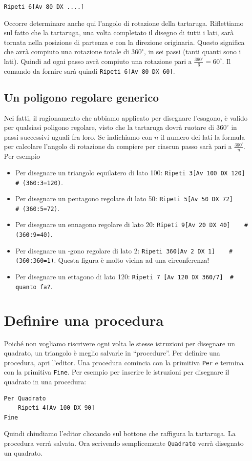 \begin{lstlisting}
Ripeti 6[Av 80 DX ....]
\end{lstlisting}
Occorre determinare anche qui l'angolo di rotazione della tartaruga. Riflettiamo sul fatto che la tartaruga, una volta completato il disegno di tutti i lati, sarà tornata nella posizione di partenza e con la direzione originaria. Questo significa che avrà compiuto una rotazione totale di $360^{\circ}$, in sei passi (tanti quanti sono i lati). Quindi ad ogni passo avrà compiuto una rotazione pari a $\frac{360^{\circ}}{6}=60^{\circ}$. Il comando da fornire sarà quindi \lstinline!Ripeti 6[Av 80 DX 60]!.



\subsection{Un poligono regolare generico}
Nei fatti, il ragionamento che abbiamo applicato per disegnare l'esagono, è valido per qualsiasi poligono regolare, visto che la tartaruga dovrà ruotare di $360^{\circ}$ in passi successivi uguali fra loro. Se indichiamo con $n$ il numero dei lati la formula per calcolare l'angolo di rotazione da compiere per ciascun passo sarà pari a $\frac{360^{\circ}}{n}$. Per esempio
\begin{itemize}
	\item Per disegnare un triangolo equilatero di lato 100: \lstinline!Ripeti 3[Av 100 DX 120]    # (360:3=120)!.
	\item Per disegnare un pentagono regolare di lato 50: \lstinline!Ripeti 5[Av 50 DX 72]    # (360:5=72)!.
	\item Per disegnare un ennagono regolare di lato 20: \lstinline!Ripeti 9[Av 20 DX 40]    # (360:9=40)!.
	\item Per disegnare un -gono regolare di lato 2: \lstinline!Ripeti 360[Av 2 DX 1]    # (360:360=1)!. Questa figura è molto vicina ad una circonferenza!
	\item Per disegnare un ettagono di lato 120: \lstinline!Ripeti 7 [Av 120 DX 360/7]  # quanto fa?!.
\end{itemize}


\section{Definire una procedura}
Poiché non vogliamo riscrivere ogni volta le stesse istruzioni per disegnare un quadrato, un triangolo \textellipsis è meglio salvarle in ``procedure''. Per definire una procedura, apri l'editor. Una procedura comincia con la primitiva \texttt{Per} e termina con la primitiva \texttt{Fine}. Per esempio per inserire le istruzioni per disegnare il quadrato in una procedura:
\begin{lstlisting}
Per Quadrato
	Ripeti 4[Av 100 DX 90]
Fine
\end{lstlisting}
Quindi chiudiamo l'editor cliccando sul bottone che raffigura la tartaruga. La procedura verrà salvata. Ora scrivendo semplicemente \texttt{Quadrato} verrà disegnato un quadrato.


